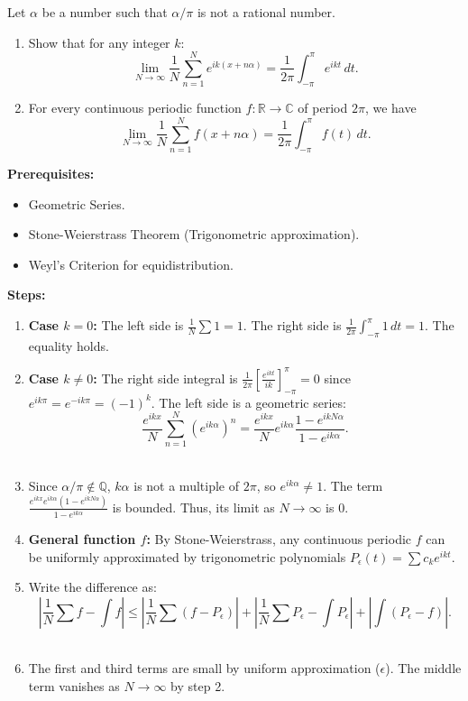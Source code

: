 \begin{exercise}
\label{analysis:2013:3}
Let $\alpha$ be a number such that $\alpha/\pi$ is not a rational number.
\begin{enumerate}
    \item Show that for any integer $k$:
    \[
    \lim_{N\to\infty} \frac{1}{N} \sum_{n=1}^N e^{ik(x+n\alpha)} = \frac{1}{2\pi}\int_{-\pi}^{\pi} e^{ikt}\,dt.
    \]
    \item For every continuous periodic function $f:\mathbb{R}\to\mathbb{C}$ of period $2\pi$, we have
    \[
    \lim_{N\to\infty} \frac{1}{N}\sum_{n=1}^N f(x+n\alpha) = \frac{1}{2\pi}\int_{-\pi}^{\pi} f(t)\,dt.
    \]
\end{enumerate}
\end{exercise}

\begin{solution}
\textbf{Prerequisites:}
\begin{itemize}
    \item Geometric Series.
    \item Stone-Weierstrass Theorem (Trigonometric approximation).
    \item Weyl's Criterion for equidistribution.
\end{itemize}

\textbf{Steps:}
\begin{enumerate}
    \item \textbf{Case $k=0$:} The left side is $\frac{1}{N} \sum 1 = 1$. The right side is $\frac{1}{2\pi} \int_{-\pi}^\pi 1 \, dt = 1$. The equality holds.\\[2ex]
    \item \textbf{Case $k \neq 0$:} The right side integral is $\frac{1}{2\pi} \left[ \frac{e^{ikt}}{ik} \right]_{-\pi}^\pi = 0$ since $e^{ik\pi} = e^{-ik\pi} = (-1)^k$.
    The left side is a geometric series:
    \[
    \frac{e^{ikx}}{N} \sum_{n=1}^N (e^{ik\alpha})^n = \frac{e^{ikx}}{N} e^{ik\alpha} \frac{1 - e^{ikN\alpha}}{1 - e^{ik\alpha}}.
    \]\\[2ex]
    \item Since $\alpha/\pi \notin \mathbb{Q}$, $k\alpha$ is not a multiple of $2\pi$, so $e^{ik\alpha} \neq 1$. The term $\frac{e^{ikx} e^{ik\alpha} (1 - e^{ikN\alpha})}{1 - e^{ik\alpha}}$ is bounded. Thus, its limit as $N \to \infty$ is 0.\\[2ex]
    \item \textbf{General function $f$:} By Stone-Weierstrass, any continuous periodic $f$ can be uniformly approximated by trigonometric polynomials $P_\epsilon(t) = \sum c_k e^{ikt}$.\\[2ex]
    \item Write the difference as:
    \[
    \left| \frac{1}{N} \sum f - \int f \right| \leq \left| \frac{1}{N} \sum (f - P_\epsilon) \right| + \left| \frac{1}{N} \sum P_\epsilon - \int P_\epsilon \right| + \left| \int (P_\epsilon - f) \right|.
    \]\\[2ex]
    \item The first and third terms are small by uniform approximation ($\epsilon$). The middle term vanishes as $N \to \infty$ by step 2.
\end{enumerate}


\end{solution}
